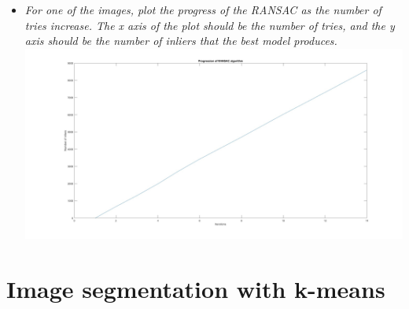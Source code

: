 \documentclass[11pt]{article}
\begin{document}
\begin{itemize}
        \item \textit{For one of the images, plot the progress of the RANSAC as the number of tries increase. The x axis
        of the plot should be the number of tries, and the y axis should be the number of inliers that the best model
        produces.}\newline
        \includegraphics[width=\textwidth]{Output Pictures/inlier_progression}\newline

    \end{itemize}


    \section{Image segmentation with k-means}
\end{document}
